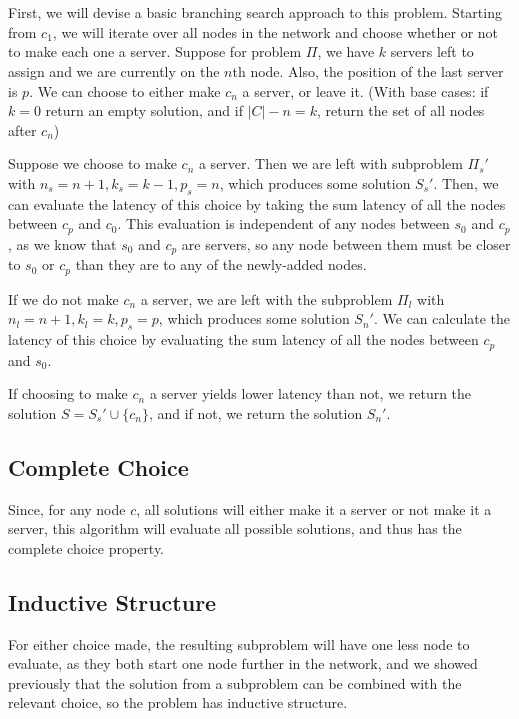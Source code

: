 \documentclass[11pt]{article}
\newcommand{\union}{\cup}
\begin{document}
\section{}




\section{}

First, we will devise a basic branching search approach to this problem. Starting from $c_1$, we will iterate over all nodes in the network and choose whether or not to make each one a server. Suppose for problem $\Pi$, we have $k$ servers left to assign and we are currently on the $n$th node. Also, the position of the last server is $p$. We can choose to either make $c_n$ a server, or leave it. (With base cases: if $k = 0$ return an empty solution, and if $|C| - n = k$, return the set of all nodes after $c_n$)

Suppose we choose to make $c_n$ a server. Then we are left with subproblem $\Pi_s'$ with $n_s = n + 1, k_s = k - 1, p_s = n$, which produces some solution $S_s'$. Then, we can evaluate the latency of this choice by taking the sum latency of all the nodes between $c_p$ and $c_0$. This evaluation is independent of any nodes between $s_0$ and $c_p$, as we know that $s_0$ and $c_p$ are servers, so any node between them must be closer to $s_0$ or $c_p$ than they are to any of the newly-added nodes.

If we do not make $c_n$ a server, we are left with the subproblem $\Pi_l$ with $n_l = n + 1, k_l = k, p_s = p$, which produces some solution $S_n'$. We can calculate the latency of this choice by evaluating the sum latency of all the nodes between $c_p$ and $s_0$.

If choosing to make $c_n$ a server yields lower latency than not, we return the solution $S = S_s' \union \{c_n\}$, and if not, we return the solution $S_n'$.

\subsection*{Complete Choice}
Since, for any node $c$, all solutions will either make it a server or not make it a server, this algorithm will evaluate all possible solutions, and thus has the complete choice property.

\subsection*{Inductive Structure}
For either choice made, the resulting subproblem will have one less node to evaluate, as they both start one node further in the network, and we showed previously that the solution from a subproblem can be combined with the relevant choice, so the problem has inductive structure.
\end{document}
